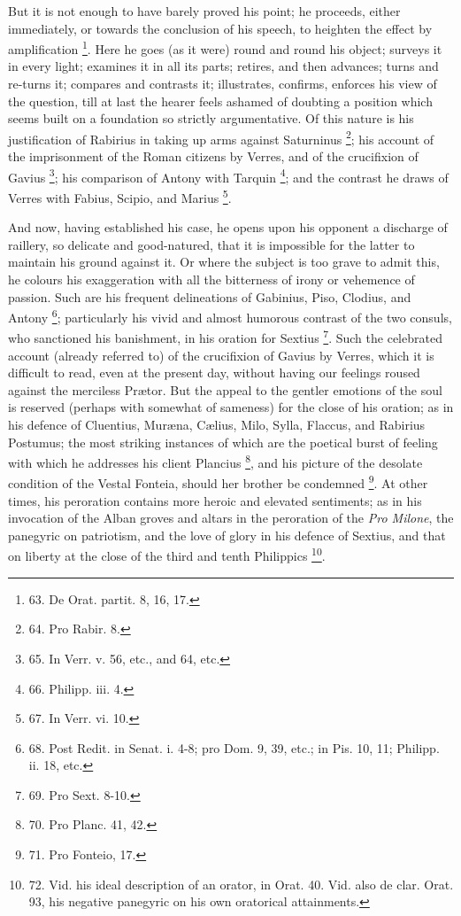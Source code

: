 But it is not enough to have
barely proved his point; he proceeds, either immediately, or towards
the conclusion of his speech, to heighten the effect by amplification
\footnote{63. De Orat. partit. 8, 16,
17.}. Here he goes (as it were) round and round his object;
surveys it in every light; examines it in all its parts; retires, and
then advances; turns and re-turns it; compares and contrasts it;
illustrates, confirms, enforces his view of the question, till
at last the hearer feels ashamed of doubting a position which seems
built on a foundation so strictly argumentative. Of this nature is his
justification of Rabirius in taking up arms against Saturninus \footnote{64. Pro
Rabir. 8.}; his account of the imprisonment of the Roman citizens by Verres,
and of the crucifixion of Gavius \footnote{65. In Verr. v. 56, etc., and
64, etc.}; his comparison of Antony
with Tarquin \footnote{66. Philipp. iii. 4.}; and the contrast he draws of Verres with
Fabius, Scipio, and Marius \footnote{67. In Verr. vi. 10.}.

And now, having established
his case, he opens upon his opponent a discharge of raillery, so
delicate and good-natured, that it is impossible for the latter to
maintain his ground against it. Or where the subject is too grave to
admit this, he colours his exaggeration with all the bitterness of
irony or vehemence of passion. Such are his frequent delineations of
Gabinius, Piso, Clodius, and Antony \footnote{68. Post Redit. in Senat. i.
4-8; pro Dom. 9, 39, etc.; in Pis. 10, 11; Philipp. ii. 18, etc.}; particularly his
vivid and almost humorous contrast of the two consuls, who sanctioned
his banishment, in his oration for Sextius \footnote{69. Pro
Sext. 8-10.}. Such the
celebrated account (already referred to) of the crucifixion of Gavius
by Verres, which it is difficult to read, even at the present day,
without having our feelings roused against the merciless Prætor. But
the appeal to the gentler emotions of the soul is reserved (perhaps
with somewhat of sameness) for the close of his oration; as in his
defence of Cluentius, Muræna, Cælius, Milo, Sylla, Flaccus, and
Rabirius Postumus; the most striking instances of which are the
poetical burst of feeling with which he addresses his client Plancius
\footnote{70. Pro Planc. 41, 42.}, and his picture of the desolate condition of the
Vestal Fonteia, should her brother be condemned \footnote{71. Pro
Fonteio, 17.}. At other
times, his peroration contains more heroic and elevated sentiments; as
in his invocation of the Alban groves and altars in the peroration of
the \emph{Pro Milone}, the panegyric on patriotism, and the love of
glory in his defence of Sextius, and that on liberty at the close of
the third and tenth Philippics \footnote{72. Vid. his ideal description
of an orator, in Orat. 40. Vid. also de clar. Orat. 93, his negative
panegyric on his own oratorical attainments.}.

